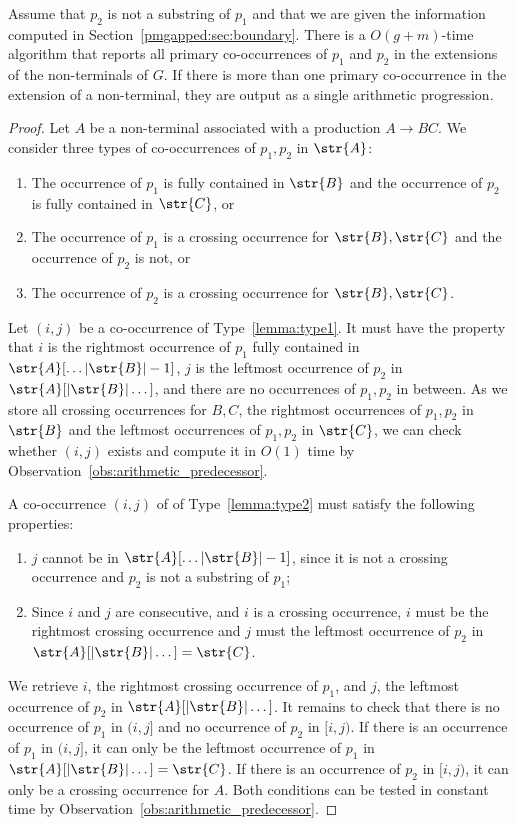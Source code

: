 \begin{lemma}\label{lem:primary}
Assume that $p_2$ is not a substring of $p_1$ and that we are given the information computed in Section~\ref{pmgapped:sec:boundary}. 
There is a $O(g+m)$-time algorithm that reports all primary co-occurrences of $p_1$ and $p_2$ in the extensions of the non-terminals of $G$. If there is more than one primary co-occurrence in the extension of a non-terminal, they are output as a single arithmetic progression. 
\end{lemma}
\begin{proof}
Let $A$ be a non-terminal associated with a production $A \rightarrow BC$. We consider three types of co-occurrences of $p_1,p_2$ in $\str{A}$:
\begin{enumerate}
	\item \label{lemma:type1} The occurrence of $p_1$ is fully contained in $\str{B}$ and the occurrence of $p_2$ is fully contained in $\str{C}$, or
	\item \label{lemma:type2} The occurrence of $p_1$ is a crossing occurrence for $\str{B},\str{C}$ and the occurrence of $p_2$ is not, or
	\item \label{lemma:type3} The occurrence of $p_2$ is a crossing occurrence for $\str{B},\str{C}$.
\end{enumerate}

Let $(i,j)$ be a co-occurrence of Type~\ref{lemma:type1}. It must have the property that $i$ is the rightmost occurrence of $p_1$ fully contained in $\str{A}[\dots |\str{B}|-1]$, $j$ is the leftmost occurrence of $p_2$ in $\str{A}[|\str{B}| \dots]$, and there are no occurrences of $p_1, p_2$ in between. As we store all crossing occurrences for $B,C$, the rightmost occurrences of $p_1,p_2$ in $\str{B}$ and the leftmost occurrences of $p_1,p_2$ in $\str{C}$, we can check whether $(i,j)$ exists and compute it in $O(1)$ time by Observation~\ref{obs:arithmetic_predecessor}.
   
A co-occurrence $(i,j)$ of of Type~\ref{lemma:type2} must satisfy the following properties: 
\begin{enumerate}
       \item $j$ cannot be in $\str{A}[\dots |\str{B}|-1]$, since it is not a crossing occurrence and $p_2$ is not a substring of $p_1$;
       \item Since $i$ and $j$ are consecutive, and $i$ is a crossing occurrence, $i$ must be the rightmost crossing occurrence and $j$ must the leftmost occurrence of $p_2$ in $\str{A}[|\str{B}| \dots] = \str{C}$.
\end{enumerate}
We retrieve $i$, the rightmost crossing occurrence of $p_1$, and $j$, the leftmost occurrence of $p_2$ in $\str{A}[|\str{B}| \dots]$. It remains to check that there is no occurrence of $p_1$ in $(i,j]$ and no occurrence of $p_2$ in $[i,j)$. If there is an occurrence of $p_1$ in $(i,j]$, it can only be the leftmost occurrence of $p_1$ in $\str{A}[|\str{B}| \dots] = \str{C}$. If there is an occurrence of $p_2$ in $[i,j)$, it can only be a crossing occurrence for $A$. Both conditions can be tested in constant time by Observation~\ref{obs:arithmetic_predecessor}. 


\end{proof}
